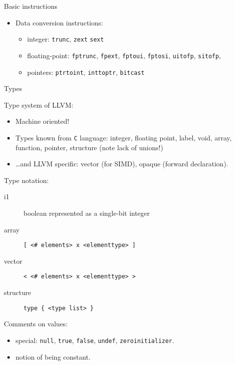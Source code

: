 \documentclass[8pt]{beamer}
\begin{document}
\begin{frame}[fragile]{Basic instructions}
\begin{block}{}
\begin{itemize}
      \item Data conversion instructions:
        \begin{itemize}
          \item integer: \verb+trunc+, \verb+zext+ \verb+sext+
          \item floating-point: \verb+fptrunc+, \verb+fpext+, \verb+fptoui+,
            \verb+fptosi+, \verb+uitofp+, \verb+sitofp+,
          \item pointers: \verb+ptrtoint+, \verb+inttoptr+, \verb+bitcast+
        \end{itemize}
    \end{itemize}
  \end{block}
\end{frame}

\begin{frame}[fragile]{Types}
  \begin{block}{Type system of LLVM:}
    \begin{itemize}
      \item Machine oriented!
      \item Types known from \verb+C+ language: integer, floating point, label,
        void, array, function, pointer, structure (note lack of unions!)
      \item \ldots and LLVM specific: vector (for SIMD), opaque (forward
        declaration).
    \end{itemize}
  \end{block}

  \begin{block}{Type notation:}
    \begin{description}
      \item[i1] boolean represented as a single-bit integer
      \item[array] \verb+[ <# elements> x <elementtype> ]+
      \item[vector] \verb+< <# elements> x <elementtype> >+
      \item[structure] \verb+type { <type list> }+
    \end{description}
  \end{block}

  \begin{block}{Comments on values:}
    \begin{itemize}
      \item special: \verb+null+, \verb+true+, \verb+false+, \verb+undef+,
        \verb+zeroinitializer+.
      \item notion of being constant.
    \end{itemize}
  \end{block}
\end{frame}
\end{document}
